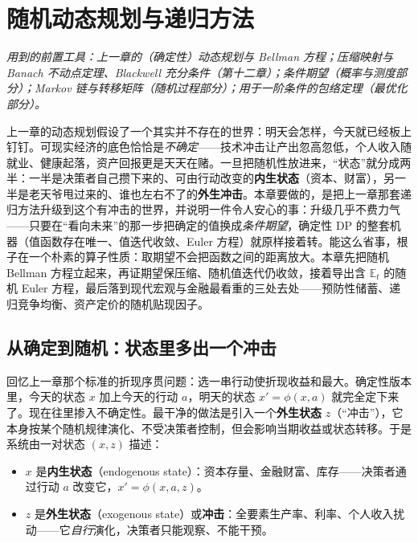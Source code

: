 \chapter{随机动态规划与递归方法}
\label{ch:stochdp}

\noindent\emph{用到的前置工具：上一章的（确定性）动态规划与 Bellman 方程；压缩映射与 Banach 不动点定理、Blackwell 充分条件（第十二章）；条件期望（概率与测度部分）；Markov 链与转移矩阵（随机过程部分）；用于一阶条件的包络定理（最优化部分）。}
\medskip

上一章的动态规划假设了一个其实并不存在的世界：明天会怎样，今天就已经板上钉钉。可现实经济的底色恰恰是\emph{不确定}——技术冲击让产出忽高忽低，个人收入随就业、健康起落，资产回报更是天天在赌。一旦把随机性放进来，``状态''就分成两半：一半是决策者自己攒下来的、可由行动改变的\textbf{内生状态}（资本、财富），另一半是老天爷甩过来的、谁也左右不了的\textbf{外生冲击}。本章要做的，是把上一章那套递归方法升级到这个有冲击的世界，并说明一件令人安心的事：升级几乎不费力气——只要在``看向未来''的那一步把确定的值换成\emph{条件期望}，确定性 DP 的整套机器（值函数存在唯一、值迭代收敛、Euler 方程）就原样接着转。能这么省事，根子在一个朴素的算子性质：取期望不会把函数之间的距离放大。本章先把随机 Bellman 方程立起来，再证期望保压缩、随机值迭代仍收敛，接着导出含 $\mathbb{E}_t$ 的随机 Euler 方程，最后落到现代宏观与金融最看重的三处去处——预防性储蓄、递归竞争均衡、资产定价的随机贴现因子。

\section{从确定到随机：状态里多出一个冲击}
\label{sec:stochdp-motivation}

回忆上一章那个标准的折现序贯问题：选一串行动使折现收益和最大。确定性版本里，今天的状态 $x$ 加上今天的行动 $a$，明天的状态 $x'=\phi(x,a)$ 就完全定下来了。现在往里掺入不确定性。最干净的做法是引入一个\textbf{外生状态} $z$（``冲击''），它本身按某个随机规律演化、不受决策者控制，但会影响当期收益或状态转移。于是系统由一对状态 $(x,z)$ 描述：

\begin{itemize}
    \item $x$ 是\textbf{内生状态}（endogenous state）：资本存量、金融财富、库存——决策者通过行动 $a$ 改变它，$x'=\phi(x,a,z)$。
    \item $z$ 是\textbf{外生状态}（exogenous state）或\textbf{冲击}：全要素生产率、利率、个人收入扰动——它\emph{自行}演化，决策者只能观察、不能干预。
\end{itemize}

